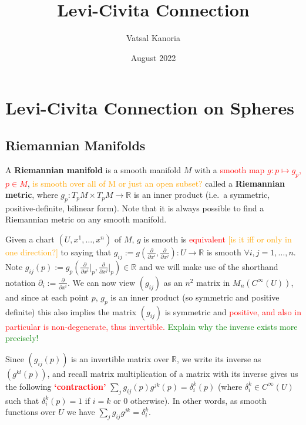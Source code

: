 \documentclass[a4paper]{article}
\theoremstyle{definition} \newtheorem*{definition}{Definition}
\theoremstyle{definition} \newtheorem*{definitions}{Definitions}
\theoremstyle{plain} \newtheorem{theorem}{Theorem}[section]
\theoremstyle{plain} \newtheorem{proposition}[theorem]{Proposition}
\theoremstyle{plain} \newtheorem{corollary}[theorem]{Corollary}
\theoremstyle{plain} \newtheorem{lemma}[theorem]{Lemma}
\theoremstyle{plain} \newtheorem{example}[theorem]{Example}
\newcommand{\checkCorrect}[1]{\textcolor{red}{#1}}
\newcommand{\question}[1]{\textcolor{orange}{#1}}
\newcommand{\finish}[1]{\textcolor{green}{#1}}
\newcommand{\defn}[1]{\textbf{#1}}
\newcommand{\realnos}{\mathbb{R}}
\begin{document}
\title{Levi-Civita Connection}
\author{Vatsal Kanoria}
\date{August 2022}
\maketitle
\section{Levi-Civita Connection on Spheres}
\subsection{Riemannian Manifolds}
A \defn{Riemannian manifold} is a smooth manifold $M$ with a \checkCorrect{smooth map $g:p\mapsto g_p$, $p\in M$}, \question{is smooth over all of M or just an open subset?} called a \defn{Riemannian metric}, where $g_p:T_pM\times T_pM\to \realnos$ is an inner product (i.e.\ a symmetric, positive-definite, bilinear form).
Note that it is always possible to find a Riemannian metric on any smooth manifold.

Given a chart $(U, x^1, \ldots, x^n)$ of $M$, $g$ is smooth is \checkCorrect{equivalent} \question{[is it iff or only in one direction?]} to saying that $g_{ij}:=g(\frac{\partial}{\partial x^i}, \frac{\partial}{\partial x^j}):U\to \realnos$ is smooth $\forall i,j=1,\ldots, n$. Note $g_{ij}(p):=g_p(\frac{\partial}{\partial x^i}\vert_p, \frac{\partial}{\partial x^j}\vert_p) \in \realnos$ and we will make use of the shorthand notation $\partial_i:=\frac{\partial}{\partial x^i}$. We can now view $(g_{ij})$ as an $n^2$ matrix in $M_n(C^\infty (U))$, and since at each point $p$, $g_p$ is an inner product (so symmetric and positive definite) this also implies the matrix $(g_{ij})$ is symmetric and \checkCorrect{positive, and also in particular is non-degenerate, thus invertible.} \finish{Explain why the inverse exists more precisely!}

Since $(g_{ij}(p))$ is an invertible matrix over $\realnos$, we write its inverse as $(g^{kl}(p))$, and recall matrix multiplication of a matrix with its inverse gives us the following \checkCorrect{\defn{`contraction'}}
$\sum_j g_{ij}(p)g^{jk}(p)=\delta_i^k(p)$ (where $\delta_i^k\in C^\infty(U)$ such that $\delta_i^k(p)=1$ if $i=k$ or $0$ otherwise). In other words, as smooth functions over $U$ we have $\sum_j g_{ij}g^{jk}=\delta_i^k$. 
\end{document}
